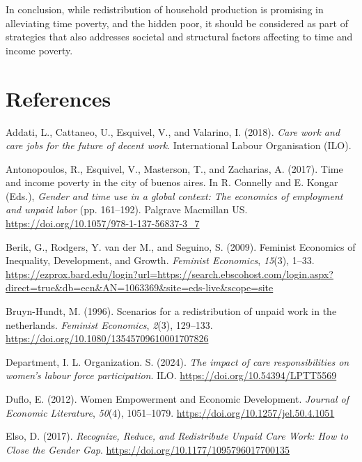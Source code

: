 \documentclass[
  11pt,
]{article}
\newlength{\cslhangindent}
\newenvironment{CSLReferences}[2] %
 {\begin{list}{}{%
  \setlength{\itemindent}{0pt}
  \setlength{\leftmargin}{0pt}
  \setlength{\parsep}{0pt}
  \ifodd #1
   \setlength{\leftmargin}{\cslhangindent}
   \setlength{\itemindent}{-1\cslhangindent}
  \fi
  \setlength{\itemsep}{#2\baselineskip}}}
 {\end{list}}
\begin{document}
In conclusion, while redistribution of household production is promising
in alleviating time poverty, and the hidden poor, it should be
considered as part of strategies that also addresses societal and
structural factors affecting to time and income poverty.

\section*{References}\label{references}

\label{refs}
\begin{CSLReferences}{1}{0}
Addati, L., Cattaneo, U., Esquivel, V., and Valarino, I. (2018).
\emph{Care work and care jobs for the future of decent work}.
International Labour Organisation (ILO).

Antonopoulos, R., Esquivel, V., Masterson, T., and Zacharias, A. (2017).
Time and income poverty in the city of buenos aires. In R. Connelly and
E. Kongar (Eds.), \emph{Gender and time use in a global context: The
economics of employment and unpaid labor} (pp. 161--192). Palgrave
Macmillan US. \url{https://doi.org/10.1057/978-1-137-56837-3_7}

Berik, G., Rodgers, Y. van der M., and Seguino, S. (2009). Feminist
{Economics} of {Inequality}, {Development}, and {Growth}. \emph{Feminist
Economics}, \emph{15}(3), 1--33.
\url{https://ezprox.bard.edu/login?url=https://search.ebscohost.com/login.aspx?direct=true&db=ecn&AN=1063369&site=eds-live&scope=site}

Bruyn-Hundt, M. (1996). Scenarios for a redistribution of unpaid work in
the netherlands. \emph{Feminist Economics}, \emph{2}(3), 129--133.
\url{https://doi.org/10.1080/13545709610001707826}

Department, I. L. Organization. S. (2024). \emph{The impact of care
responsibilities on women's labour force participation}. ILO.
\url{https://doi.org/10.54394/LPTT5569}

Duflo, E. (2012). Women {Empowerment} and {Economic} {Development}.
\emph{Journal of Economic Literature}, \emph{50}(4), 1051--1079.
\url{https://doi.org/10.1257/jel.50.4.1051}

Elso, D. (2017). \emph{Recognize, {Reduce}, and {Redistribute} {Unpaid}
{Care} {Work}: {How} to {Close} the {Gender} {Gap}}.
\url{https://doi.org/10.1177/1095796017700135}


\end{CSLReferences}
\end{document}
